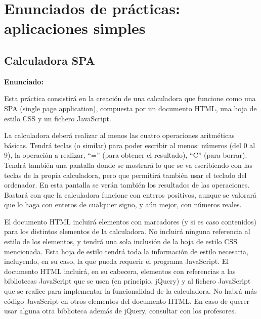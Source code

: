 

\chapter{Enunciados de prácticas: aplicaciones simples}

\section{Calculadora SPA}
\label{sec:voluntaria-calculadora}

\textbf{Enunciado:}

Esta práctica consistirá en la creación de una calculadora que funcione como una SPA (single page application), compuesta por un documento HTML, una hoja de estilo CSS y un fichero JavaScript.

La calculadora deberá realizar al menos las cuatro operaciones aritméticas básicas. Tendrá teclas (o similar) para poder escribir al menos: números (del 0 al 9), la operación a realizar, ``='' (para obtener el resultado), ``C'' (para borrar). Tendrá también una pantalla donde se mostrará lo que se va escribiendo con las teclas de la propia calculadora, pero que permitirá también usar el teclado del ordenador. En esta pantalla se verán también los resultados de las operaciones. Bastará con que la calculadora funcione con enteros positivos, aunque se valorará que lo haga con enteros de cualquier signo, y aún mejor, con números reales.

El documento HTML incluirá elementos con marcadores (y si es caso contenidos) para los distintos elementos de la calculadora. No incluirá ninguna referencia al estilo de los elementos, y tendrá una sola inclusión de la hoja de estilo CSS mencionada. Esta hoja de estilo tendrá toda la información de estilo necesaria, incluyendo, en su caso, la que pueda requerir el programa JavaScript. El documento HTML incluirá, en su cabecera, elementos con referencias a las bibliotecas JavaScript que se usen (en principio, jQuery) y al fichero JavaScript que se realice para implementar la funcionalidad de la calculadora. No habrá más código JavaScript en otros elementos del documento HTML. En caso de querer usar alguna otra biblioteca además de jQuery, consultar con los profesores.

